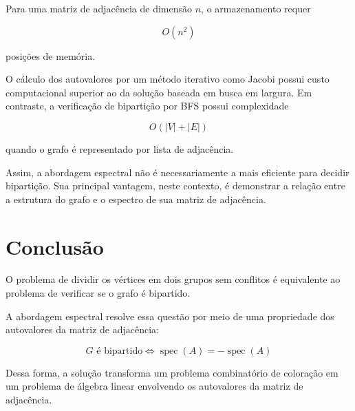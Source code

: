 \documentclass[12pt,a4paper]{article}
\begin{document}
Para uma matriz de adjacência de dimensão $n$, o armazenamento requer

$$
O(n^2)
$$

posições de memória.

O cálculo dos autovalores por um método iterativo como Jacobi possui
custo computacional superior ao da solução baseada em busca em largura.
Em contraste, a verificação de bipartição por BFS possui complexidade

$$
O(|V|+|E|)
$$

quando o grafo é representado por lista de adjacência.

Assim, a abordagem espectral não é necessariamente a mais eficiente
para decidir bipartição. Sua principal vantagem, neste contexto, é
demonstrar a relação entre a estrutura do grafo e o espectro de sua
matriz de adjacência.

\section{Conclusão}

O problema de dividir os vértices em dois grupos sem conflitos é
equivalente ao problema de verificar se o grafo é bipartido.

A abordagem espectral resolve essa questão por meio de uma propriedade
dos autovalores da matriz de adjacência:

$$
\boxed{
G\text{ é bipartido}
\iff
\operatorname{spec}(A)
=
-\operatorname{spec}(A)
}
$$

Dessa forma, a solução transforma um problema combinatório de
coloração em um problema de álgebra linear envolvendo os autovalores
da matriz de adjacência.
\end{document}
